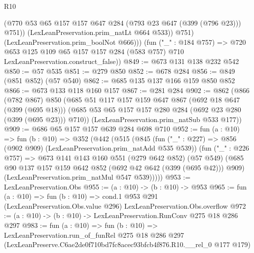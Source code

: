 \begin{lexlean}{R10}
\begin{coremodule}
                (@770 @53 @65 @157 @157 @647 @284 (@793 @23 @647 (@399 (@796 @23))) @751))
              (LexLeanPreservation.prim_natLt @664 @533))
            @751)
          (LexLeanPreservation.prim_boolNot @666)))
      (fun ("_" : @184 @757) =>
      @720 @653 @125 @109 @65 @157 @157 @284 (@583 @757) @710 LexLeanPreservation.construct_false))
@849 := @673 @131 @138 @232 @542
@850 := @57 @535
@851 := @279 @850
@852 := @678 @284
@856 := @849 (@851 @852) (@57 @540)
@862 := @685 @135 @137 @166 @159 @850 @852
@866 := @673 @133 @118 @160 @157
@867 := @281 @284
@902 := @862
    (@866
      (@782 @867)
      @850
      (@685
        @51
        @117
        @157
        @159
        @647
        @867
        (@692 @18 @647 (@399 (@695 @18)))
        (@685 @53 @65 @157 @157 @280 @284 (@692 @23 @280 (@399 (@695 @23))) @710))
      (LexLeanPreservation.prim_natSub @533 @177))
@909 := @686 @65 @157 @157 @639 @284 @698 @710
@952 := fun (a : @10) =>
  fun (b : @10) =>
  @352
    (@442
      (@515
        (@845
          (fun ("_" : @227) => @856 (@902 @909) (LexLeanPreservation.prim_natAdd @535 @539))
          (fun ("_" : @226 @757) =>
          @673
            @141
            @143
            @160
            @551
            (@279 @642 @852)
            (@57 @549)
            (@685 @90 @137 @157 @159 @642 @852 (@692 @42 @642 (@399 (@695 @42))) @909)
            (LexLeanPreservation.prim_natMul @547 @539)))))
@953 := LexLeanPreservation.Obs
@955 := (a : @10) -> (b : @10) -> @953
@965 := fun (a : @10) =>
  fun (b : @10) =>
  cond.{1} @953 @291 (LexLeanPreservation.Obs.value @296) LexLeanPreservation.Obs.overflow
@972 := (a : @10) -> (b : @10) -> LexLeanPreservation.RunConv @275 @18 @286 @297
@983 := fun (a : @10) =>
  fun (b : @10) =>
  LexLeanPreservation.run_of_funRel
    @275
    @18
    @286
    @297
    (LexLeanPreserve.C6ae2de0f710bd7fc8acec93bfcb4f876.R10.__rel_0 @177 @179)
\end{coremodule}
\end{lexlean}
